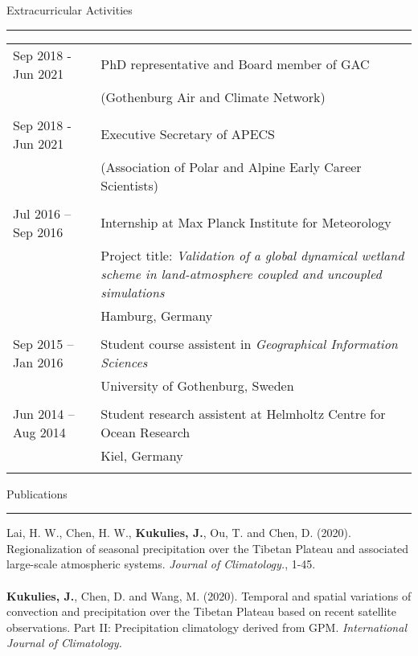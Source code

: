 \documentclass[a4paper,12pt]{article}
\begin{document}
\begin{titlepage}
\flushleft\large Extracurricular Activities
\\[-2ex]
\rule{1\textwidth}{0.7pt}
\smallskip
\begin{table}[h!]
  \begin{tabular}{p{3.7cm}p{0.5cm}|p{12cm}}
 Sep 2018 - Jun 2021 && PhD representative and Board member of GAC \\
  && (Gothenburg Air and Climate Network)\\
  &&\\
 Sep 2018 - Jun 2021 && Executive Secretary of APECS \\
  && (Association of Polar and Alpine Early Career Scientists)\\
  &&\\
	Jul 2016 -- Sep 2016 & & Internship at Max Planck Institute for Meteorology \\
  && Project title: \textit{Validation of a global dynamical wetland scheme in land-atmosphere coupled and uncoupled simulations}\\
	& & Hamburg, Germany \\
  &&\\
	Sep 2015 -- Jan 2016 & & Student course assistent in \textit{Geographical Information Sciences}\\
  &&  University of Gothenburg, Sweden\\
  &&\\
	Jun 2014 -- Aug 2014 & & Student research assistent at Helmholtz Centre for Ocean Research \\
	&& Kiel, Germany \\
	& & \\[-1.7ex]
	\end{tabular}
\end{table}


\flushtop
\flushleft\large Publications
\\[-2ex]
\rule{1\textwidth}{0.7pt}
\begin{table}[h!]


Lai, H. W., Chen, H. W., \textbf{Kukulies, J.}, Ou, T. and  Chen, D. (2020). Regionalization of seasonal precipitation over the Tibetan Plateau and associated large-scale atmospheric systems. \textit{Journal of Climatology.}, 1-45.\\
\\[-1.7ex]


    \textbf{Kukulies, J.}, Chen, D. and Wang, M. (2020). Temporal and spatial variations of convection and precipitation over the Tibetan Plateau based on recent satellite observations. Part II: Precipitation climatology derived from GPM. \textit{International Journal of Climatology.}\\


\end{table}
\end{titlepage}
\end{document}
